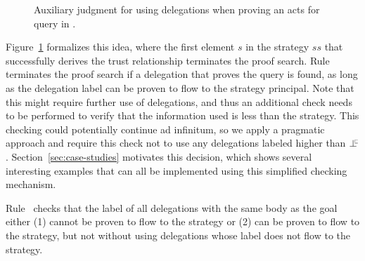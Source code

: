 \begin{figure}
    \centering
    \caption{Auxiliary judgment for using delegations when proving an acts for query in \lang.}
    \label{fig:act-for-judgment-del}
\end{figure}

Figure~\ref{fig:act-for-judgment-del} formalizes this idea, where the first element $s$ in the strategy $\mathit{ss}$ that successfully derives the trust relationship terminates the proof search. Rule  terminates the proof search if a delegation that proves the query is found, as long as the delegation label can be proven to flow to the strategy principal. Note that this might require further use of delegations, and thus an additional check needs to be performed to verify that the information used is less than the strategy. This checking could potentially continue ad infinitum, so we apply a pragmatic approach and require this check not to use any delegations labeled higher than $\botinfoflow$. Section~\ref{sec:case-studies} motivates this decision, which shows several interesting examples that can all be implemented using this simplified checking mechanism.

Rule~ checks that the label of all delegations with the same body as the goal either (1) cannot be proven to flow to the strategy or (2) can be proven to flow to the strategy, but not without using delegations whose label does not flow to the strategy.


